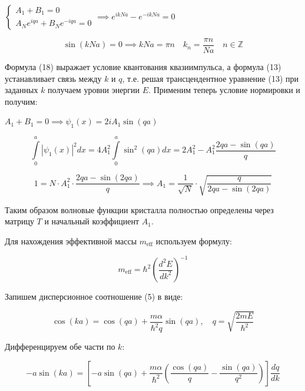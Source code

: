 \documentclass[a4paper, 12pt]{article}
\begin{document}
	\begin{center}
		$\begin{cases}
			A_1 + B_1 = 0 \\
			A_N e^{iqa} + B_N e^{-iqa} = 0
		\end{cases} \implies e^{ikNa} - e^{-ikNa} = 0$
	\end{center}
	
	\begin{equation}
		\sin(kNa) = 0 \implies kNa = \pi n \quad k_n = \dfrac{\pi n }{Na} \quad n \in \mathbb{Z}
	\end{equation}
	
	\quad Формула (18) выражает условие квантования квазиимпульса, а формула (13) устанавливает связь между $k$ и $q$, т.е. решая трансцендентное уравнение (13) при заданных $k$ получаем уровни энергии $E$. Применим теперь условие нормировки и получим: 
	
	\begin{center}
		$A_1 + B_1 = 0 \implies \psi_1(x) = 2iA_1 \sin(qa)$ 
	\end{center}
	
	\begin{equation}
		\displaystyle\int\limits_{0}^{a}  |\psi_1(x)|^2 dx = 4A_1^2 \displaystyle\int\limits_{0}^{a} \sin^2 (qa) dx = 2A_1^2 - A_1^2 \dfrac{2qa - \sin(qa)}{q} 
	\end{equation}
	
	\begin{equation}
		1 = N\cdot A_1^2 \cdot \dfrac{2qa - \sin(2qa)}{q} \implies A_1 = \dfrac{1}{\sqrt{N}} \cdot \sqrt{\dfrac{q}{2qa - \sin(2qa)}}
	\end{equation}
	
	\quad Таким образом волновые функции кристалла полностью определены через матрицу $T$ и начальный коэффициент $A_1$. 
	
	\quad Для нахождения эффективной массы $m_{\text{eff}}$ используем формулу:
	
	\begin{equation}
		m_{\text{eff}} = \hbar^2 \left( \dfrac{d^2E}{dk^2} \right)^{-1}
	\end{equation}
	
	\quad Запишем дисперсионное соотношение (5) в виде:
	
	\[
	\cos(ka) = \cos(qa) + \dfrac{m\alpha}{\hbar^2 q} \sin(qa), \quad q = \sqrt{\dfrac{2mE}{\hbar^2}}
	\]
	
	\quad Дифференцируем обе части по $k$:
	
	\[
	-a\sin(ka) = \left[ -a\sin(qa) + \dfrac{m\alpha}{\hbar^2} \left( \dfrac{\cos(qa)}{q} - \dfrac{\sin(qa)}{q^2} \right) \right] \dfrac{dq}{dk}
	\]
	
\end{document}
